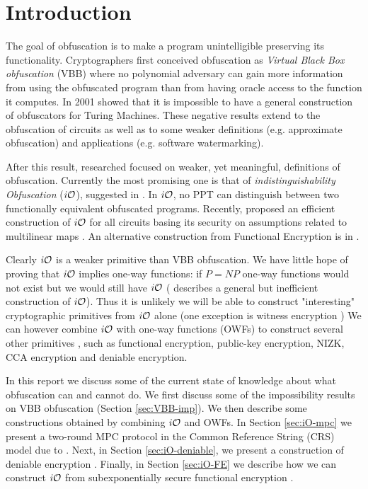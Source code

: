 
\section{Introduction}
The goal of obfuscation is to make a program unintelligible preserving its functionality.
Cryptographers first conceived obfuscation as \emph{Virtual Black Box obfuscation} (VBB) where
no polynomial adversary can gain more information from using the obfuscated program than from having
oracle access to the function it computes. In 2001 \cite{VBB-imp} showed that it is impossible to have a general construction of obfuscators for Turing Machines. These negative results extend to the obfuscation of circuits as well as to some weaker definitions (e.g. approximate obfuscation) and applications (e.g. software watermarking).

After this result, researched focused on weaker, yet meaningful, definitions of
obfuscation. Currently the most promising one is that of \emph{indistinguishability Obfuscation} ($i\mathcal{O}$), suggested in \cite{VBB-imp}. In $i\mathcal{O}$, no PPT can distinguish between two functionally equivalent obfuscated programs. Recently, \cite{garg2013candidate} proposed an efficient construction of $i\mathcal{O}$ for all circuits basing its security on assumptions related to multilinear maps \cite{garg2013candidatemulti}. An alternative construction from Functional Encryption is in \cite{iO-FE}.

Clearly $i\mathcal{O}$ is a weaker primitive than VBB obfuscation. We have little hope of proving that $i\mathcal{O}$ implies one-way functions: if $P = NP$ one-way functions would not exist but we would still have $i\mathcal{O}$ (\cite{VBB-imp} describes a general but inefficient construction of $i\mathcal{O}$). 
Thus it is unlikely we will be able to construct "interesting" cryptographic primitives from
$i\mathcal{O}$ alone (one exception is witness encryption \cite{garg2013witness}) 
We can however combine $i\mathcal{O}$ with one-way functions (OWFs) to construct several other primitives \cite{iO-deniable}, such as functional encryption, public-key encryption, NIZK, CCA encryption and deniable encryption.


In this report we discuss some of the current state of knowledge about what obfuscation can and cannot do.
We first discuss some of the impossibility results on VBB obfuscation (Section \ref{sec:VBB-imp}). 
We then describe some constructions obtained by combining $i\mathcal{O}$ and OWFs. In Section \ref{sec:iO-mpc} we present a two-round MPC protocol in the Common Reference String (CRS) model due to \cite{MPC-iO}. Next, in Section \ref{sec:iO-deniable}, we present a construction of deniable encryption \cite{iO-deniable}. Finally, in Section \ref{sec:iO-FE} we describe how we can construct $i\mathcal{O}$ from subexponentially secure functional encryption 
\cite{iO-FE}.


